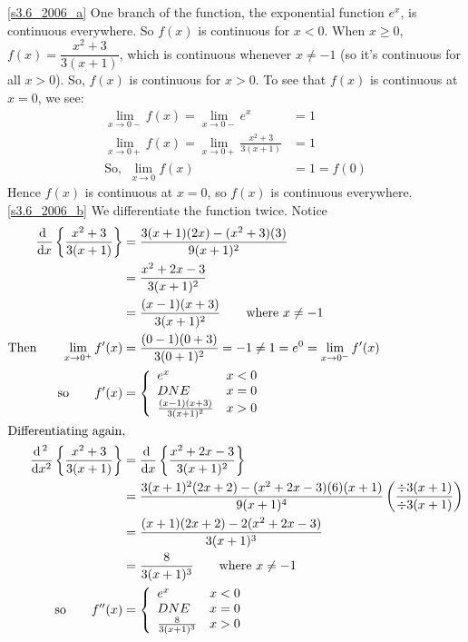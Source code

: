 \begin{solution}
\eqref{s3.6_2006_a}
One branch of the function,
the exponential function $e^x$, is continuous everywhere. So $f(x)$ is continuous for $x<0$. When $x \geq 0$, $f(x)=\dfrac{x^2+3}{3(x+1)}$, which is continuous whenever $x \neq -1$ (so it's continuous for all $x >0$). So, $f(x)$ is continuous for $x>0$. To see that $f(x)$ is continuous at $x=0$, we see:
\begin{align*}
\lim_{x\rightarrow0-}f(x)=\lim_{x\rightarrow0-}e^x&=1\\
\lim_{x\rightarrow0+}f(x)=\lim_{x\rightarrow0+}\frac{x^2+3}{3(x+1)}&=1\\
\mbox{So, }~\lim_{x \rightarrow 0}f(x)&=1=f(0)
\end{align*}
Hence $f(x)$ is continuous at $x=0$, so $f(x)$ is continuous everywhere.\\
\eqref{s3.6_2006_b}
We differentiate the function twice.
 Notice
 \begin{align*}
 \diff{}{x}\left\{\dfrac{x^2+3}{3(x+1)}\right\}&=\frac{3(x+1)(2x)-(x^2+3)(3)}{9(x+1)^2}\\
&=\frac{x^2+2x-3}{3(x+1)^2}\\
 &=\frac{(x-1)(x+3)}{3(x+1)^2}\qquad\mbox{where $x \neq -1$}\\
 \mbox{Then}\qquad
  \lim_{x \to 0^+}f'(x)&=\frac{(0-1)(0+3)}{3(0+1)^2}=-1 \neq 1 =e^0= \lim_{x \to 0^-}f'(x)\\
 \mbox{so}\qquad
f'(x)&=\left\{\begin{array}{ll}
e^x&x<0\\
DNE&x=0\\
\frac{(x-1)(x+3)}{3(x+1)^2}&x > 0
\end{array}\right.\\
 \intertext{Differentiating again,}
 \diff{^2}{x^2}\left\{\dfrac{x^2+3}{3(x+1)}\right\}&=
 \diff{}{x}\left\{\frac{x^2+2x-3}{3(x+1)^2}
 \right\}\\
 &=\frac{3(x+1)^2(2x+2)-(x^2+2x-3)(6)(x+1)}{9(x+1)^4}\left(\frac{\div3(x+1)}{\div3(x+1)}\right)\\
 &=\frac{(x+1)(2x+2)-2(x^2+2x-3)}{3(x+1)^3}\\
 &=\frac{8}{3(x+1)^3}\qquad\mbox{where $x \neq -1$}\\
 \mbox{so}\qquad
f''(x)&=\left\{\begin{array}{ll}
e^x&x<0\\
DNE&x=0\\
\frac{8}{3(x+1)^3}&x > 0
\end{array}\right.
 \end{align*}


\end{solution}
